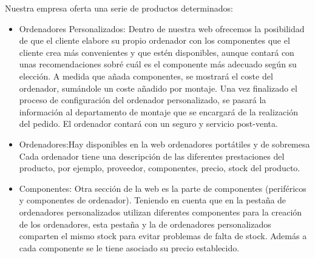 Nuestra empresa oferta una serie de productos determinados:
\begin{itemize}
    \item Ordenadores Personalizados: Dentro de nuestra web ofrecemos la posibilidad de que el cliente elabore su propio ordenador con los componentes que el cliente crea más convenientes y que estén disponibles, aunque contará con unas recomendaciones sobré cuál es el componente más adecuado según su elección. A medida que añada componentes, se mostrará el coste del ordenador, sumándole un coste añadido por montaje. Una vez finalizado el proceso de configuración del ordenador personalizado, se pasará la información al departamento de montaje que se encargará de la realización del pedido. El ordenador contará con un seguro y servicio post-venta.
    \item Ordenadores:Hay disponibles en la web ordenadores portátiles y de sobremesa Cada ordenador tiene una descripción de las diferentes prestaciones del producto, por ejemplo, proveedor, componentes, precio, stock del producto. 
    \item Componentes: Otra sección de la web es la parte de componentes (periféricos y componentes de ordenador). Teniendo en cuenta que en la pestaña de ordenadores personalizados utilizan diferentes componentes para la creación de los ordenadores, esta pestaña y la de ordenadores personalizados comparten el mismo stock para evitar problemas de falta de stock. Además a cada componente se le tiene asociado su precio establecido.    
\end{itemize}